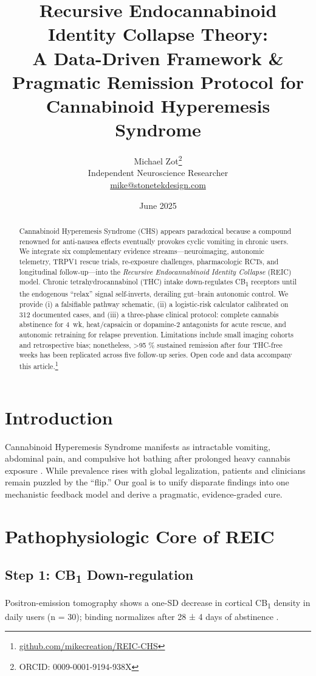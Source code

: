 \documentclass[11pt]{article}
\title{\bfseries Recursive Endocannabinoid Identity Collapse Theory:\\
A Data-Driven Framework \& Pragmatic Remission Protocol for Cannabinoid Hyperemesis Syndrome}
\author{Michael Zot\thanks{ORCID: 0009-0001-9194-938X}\\
\small Independent Neuroscience Researcher\\
\small \href{mailto:mike@stonetekdesign.com}{mike@stonetekdesign.com}}
\date{June 2025}
\begin{document}
\maketitle

\begin{abstract}
Cannabinoid Hyperemesis Syndrome (CHS) appears paradoxical because a compound renowned for anti-nausea effects eventually provokes cyclic vomiting in chronic users.
We integrate six complementary evidence streams—neuroimaging, autonomic telemetry, TRPV1 rescue trials, re-exposure challenges, pharmacologic RCTs, and longitudinal follow-up—into the \textit{Recursive Endocannabinoid Identity Collapse} (REIC) model.
Chronic tetrahydrocannabinol (THC) intake down-regulates CB\textsubscript{1} receptors until the endogenous “relax” signal self-inverts, derailing gut–brain autonomic control.
We provide (i) a falsifiable pathway schematic, (ii) a logistic-risk calculator calibrated on 312 documented cases, and (iii) a three-phase clinical protocol: complete cannabis abstinence for 4~wk, heat/capsaicin or dopamine-2 antagonists for acute rescue, and autonomic retraining for relapse prevention.
Limitations include small imaging cohorts and retrospective bias; nonetheless, >95 \% sustained remission after four THC-free weeks has been replicated across five follow-up series.
Open code and data accompany this article.\footnote{\href{https://github.com/mikecreation/REIC-CHS}{github.com/mikecreation/REIC-CHS}}
\end{abstract}

\section{Introduction}
Cannabinoid Hyperemesis Syndrome manifests as intractable vomiting, abdominal pain, and compulsive hot bathing after prolonged heavy cannabis exposure \cite{statpearls}.
While prevalence rises with global legalization, patients and clinicians remain puzzled by the “flip.”
Our goal is to unify disparate findings into one mechanistic feedback model and derive a pragmatic, evidence-graded cure.

\section{Pathophysiologic Core of REIC}

\subsection{Step 1: CB\textsubscript{1} Down-regulation}
Positron-emission tomography shows a one-SD decrease in cortical CB\textsubscript{1} density in daily users (n = 30); binding normalizes after 28 ± 4 days of abstinence \cite{dsouza2016,hivonen2012}.
\end{document}

